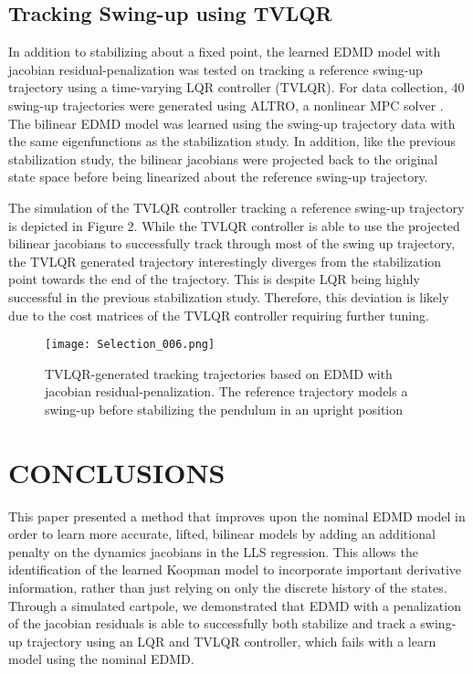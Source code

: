 \documentclass[letterpaper, 10 pt, conference]{ieeeconf}  %
\begin{document}
\subsection{Tracking Swing-up using TVLQR}

In addition to stabilizing about a fixed point, the learned EDMD model with jacobian residual-penalization was tested on tracking a reference swing-up trajectory using a time-varying LQR controller (TVLQR). For data collection, 40 swing-up trajectories were generated using ALTRO, a nonlinear MPC solver \cite{13}. The bilinear EDMD model was learned using the swing-up trajectory data with the same eigenfunctions as the stabilization study. In addition, like the previous stabilization study, the bilinear jacobians were projected back to the original state space before being linearized about the reference swing-up trajectory.

The simulation of the TVLQR controller tracking a reference swing-up trajectory is depicted in Figure 2. While the TVLQR controller is able to use the projected bilinear jacobians to successfully track through most of the swing up trajectory, the TVLQR generated trajectory interestingly diverges from the stabilization point towards the end of the trajectory. This is despite LQR being highly successful in the previous stabilization study. Therefore, this deviation is likely due to the cost matrices of the TVLQR controller requiring further tuning.

\begin{figure}[thpb]
  \centering
  \texttt{[image: Selection\_006.png]}
  \caption{TVLQR-generated tracking trajectories based on EDMD with jacobian residual-penalization. The reference trajectory models a swing-up before stabilizing the pendulum in an upright position}
  \label{figurelabel}
\end{figure}

\section{CONCLUSIONS}

This paper presented a method that improves upon the nominal EDMD model in order to learn more accurate, lifted, bilinear models by adding an additional penalty on the dynamics jacobians in the LLS regression. This allows the identification of the learned Koopman model to incorporate important derivative information, rather than just relying on only the discrete history of the states. Through a simulated cartpole, we demonstrated that EDMD with a penalization of the jacobian residuals is able to successfully both stabilize and track a swing-up trajectory using an LQR and TVLQR controller, which fails with a learn model using the nominal EDMD.
\end{document}
